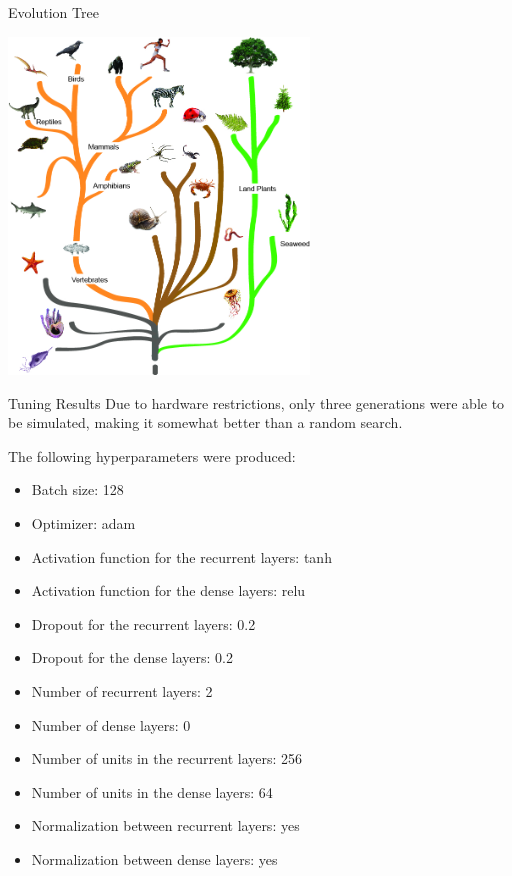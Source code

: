 \documentclass[10pt]{beamer}
\begin{document}
\begin{frame}{Evolution Tree}
\begin{center}
\includegraphics[width=0.6\textwidth]{figures/evolution-tree}
\end{center}
\end{frame}


\begin{frame}{Tuning Results}
Due to hardware restrictions, only three generations were able to be simulated, making it somewhat better than a random search.
\par
The following hyperparameters were produced:
\begin{itemize}
	\item Batch size: 128
	\item Optimizer: adam
	\item Activation function for the recurrent layers: tanh
	\item Activation function for the dense layers: relu
	\item Dropout for the recurrent layers: 0.2
	\item Dropout for the dense layers: 0.2
	\item Number of recurrent layers: 2
	\item Number of dense layers: 0
	\item Number of units in the recurrent layers: 256
	\item Number of units in the dense layers: 64
	\item Normalization between recurrent layers: yes
	\item Normalization between dense layers: yes
\end{itemize}
\end{frame}
\end{document}
